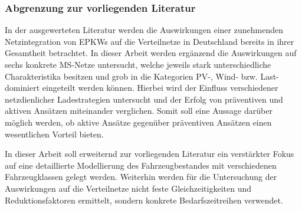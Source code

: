 \subsubsection{Abgrenzung zur vorliegenden Literatur}

In der ausgewerteten Literatur werden die Auswirkungen einer zunehmenden Netzintegration von \glspl{EPKW} auf die Verteilnetze in Deutschland bereits in ihrer Gesamtheit betrachtet.
In dieser Arbeit werden ergänzend die Auswirkungen auf sechs konkrete \gls{MS}-Netze untersucht, welche jeweils stark unterschiedliche Charakteristika besitzen und grob in die Kategorien \gls{PV}-, Wind- bzw. Last-dominiert eingeteilt werden können.
Hierbei wird der Einfluss verschiedener netzdienlicher Ladestrategien untersucht und der Erfolg von präventiven und aktiven Ansätzen miteinander verglichen.
Somit soll eine Aussage darüber möglich werden, ob aktive Ansätze gegenüber präventiven Ansätzen einen wesentlichen Vorteil bieten.\medskip

In dieser Arbeit soll erweiternd zur vorliegenden Literatur ein verstärkter Fokus auf eine detaillierte Modellierung des Fahrzeugbestandes mit verschiedenen Fahrzeugklassen gelegt werden.
Weiterhin werden für die Untersuchung der Auswirkungen auf die Verteilnetze nicht feste Gleichzeitigkeiten und Reduktionsfaktoren ermittelt, sondern konkrete Bedarfszeitreihen verwendet.


\clearpage
